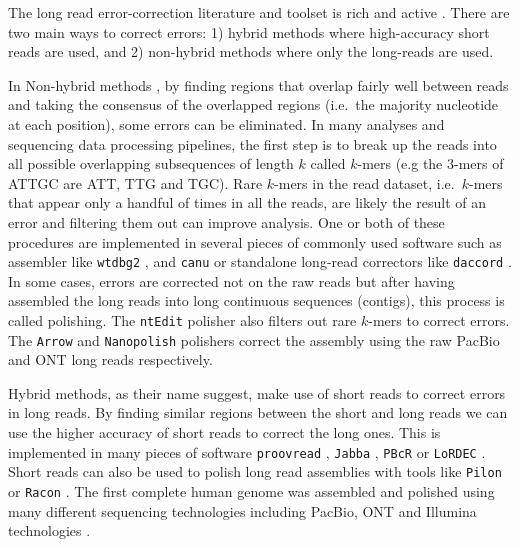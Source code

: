 \documentclass[
  11pt,
  twoside,
  BCOR=10mm,
  listof=totoc]{scrbook}
\begin{document}
The long read error-correction literature and toolset is rich and active \autocite{limaComparativeAssessmentLongread2020,fuComparativeEvaluationHybrid2019,zhangComprehensiveEvaluationLong2020}. There are two main ways to correct errors: 1) hybrid methods where high-accuracy short reads are used, and 2) non-hybrid methods where only the long-reads are used.

In Non-hybrid methods \autocite{limaComparativeAssessmentLongread2020,amarasingheOpportunitiesChallengesLongread2020}, by finding regions that overlap fairly well between reads and taking the consensus of the overlapped regions (i.e.~the majority nucleotide at each position), some errors can be eliminated. In many analyses and sequencing data processing pipelines, the first step is to break up the reads into all possible overlapping subsequences of length \(k\) called \(k\)-mers (e.g the 3-mers of ATTGC are ATT, TTG and TGC). Rare \(k\)-mers in the read dataset, i.e.~\(k\)-mers that appear only a handful of times in all the reads, are likely the result of an error and filtering them out can improve analysis. One or both of these procedures are implemented in several pieces of commonly used software such as assembler like \texttt{wtdbg2} \autocite{ruanFastAccurateLongread2020}, and \texttt{canu} \autocite{korenCanuScalableAccurate2017} or standalone long-read correctors like \texttt{daccord} \autocite{tischlerNonHybridLong2017}. In some cases, errors are corrected not on the raw reads but after having assembled the long reads into long continuous sequences (contigs), this process is called polishing. The \texttt{ntEdit} polisher \autocite{warrenNtEditScalableGenome2019} also filters out rare \(k\)-mers to correct errors. The \texttt{Arrow} \autocite{heplerImprovedCircularConsensus2016} and \texttt{Nanopolish} \autocite{simpsonDetectingDNACytosine2017} polishers correct the assembly using the raw PacBio and ONT long reads respectively.

Hybrid methods, as their name suggest, make use of short reads to correct errors in long reads. By finding similar regions between the short and long reads we can use the higher accuracy of short reads to correct the long ones. This is implemented in many pieces of software \texttt{proovread} \autocite{hacklProovreadLargescaleHighaccuracy2014}, \texttt{Jabba} \autocite{miclotteJabbaHybridError2016}, \texttt{PBcR} \autocite{korenHybridErrorCorrection2012} or \texttt{LoRDEC} \autocite{salmelaLoRDECAccurateEfficient2014}. Short reads can also be used to polish long read assemblies with tools like \texttt{Pilon} \autocite{walkerPilonIntegratedTool2014} or \texttt{Racon} \autocite{vaserFastAccurateNovo2017}. The first complete human genome was assembled and polished using many different sequencing technologies including PacBio, ONT and Illumina technologies \autocite{nurk2022}.
\end{document}
